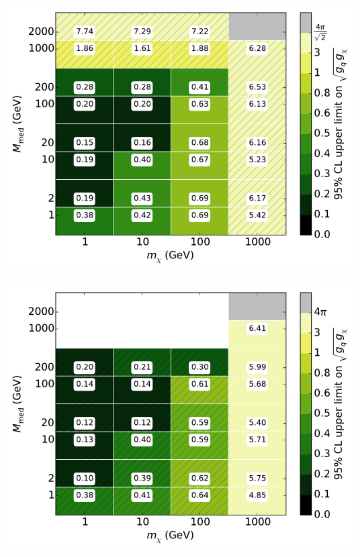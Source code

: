 \begin{figure}[h]
  \centering
    \begin{subfigure}[t]{0.495\textwidth}
      \centering
      \includegraphics[width=1.\textwidth]{figures/grid_basepoints_SVD_rat05_monojet.pdf}
      \caption{}
    \end{subfigure}
    \begin{subfigure}[t]{0.495\textwidth}
      \centering
      \includegraphics[width=1.\textwidth]{figures/grid_basepoints_SVD_rat1_monojet.pdf}
      \caption{}
    \end{subfigure}
    \begin{subfigure}[t]{0.495\textwidth}
      \centering

\end{subfigure}
\end{figure}
